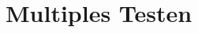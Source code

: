 \documentclass[10pt]{report}
\theoremstyle{definition}
\begin{document}
\section{Multiples Testen}
\end{document}
